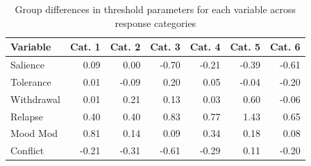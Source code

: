 \begin{table}[H]
\centering
\caption{Group differences in threshold parameters for each variable across response categories} 
\label{tab:threshold_diffs}
\begin{tabular}{lrrrrrr}
  \hline
\textbf{Variable} & \textbf{Cat. 1} & \textbf{Cat. 2} & \textbf{Cat. 3} & \textbf{Cat. 4} & \textbf{Cat. 5} & \textbf{Cat. 6} \\ 
  \hline
Salience & 0.09 & 0.00 & -0.70 & -0.21 & -0.39 & -0.61 \\ 
  Tolerance & 0.01 & -0.09 & 0.20 & 0.05 & -0.04 & -0.20 \\ 
  Withdrawal & 0.01 & 0.21 & 0.13 & 0.03 & 0.60 & -0.06 \\ 
  Relapse & 0.40 & 0.40 & 0.83 & 0.77 & 1.43 & 0.65 \\ 
  Mood Mod & 0.81 & 0.14 & 0.09 & 0.34 & 0.18 & 0.08 \\ 
  Conflict & -0.21 & -0.31 & -0.61 & -0.29 & 0.11 & -0.20 \\ 
   \hline
\end{tabular}
\end{table}
